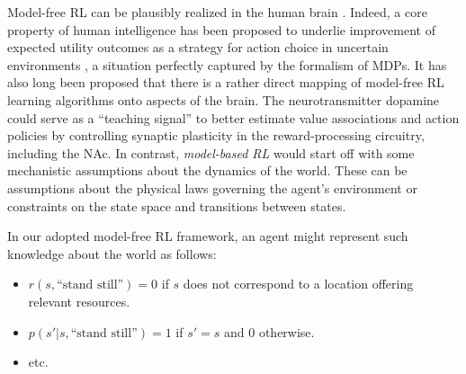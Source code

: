 \documentclass[10pt,letterpaper]{article}
\begin{document}
Model-free RL can be plausibly realized in the human brain \citep{doherty2015structure}. Indeed,
a core property of human intelligence has been proposed to underlie improvement
of expected utility outcomes as a strategy for action choice in uncertain
environments \citep{gershman2015computational}, a situation perfectly captured by the formalism of MDPs.
It has also long been proposed \citep{dayan2008decision} that there
is a rather direct mapping of model-free RL learning algorithms
onto aspects of the brain.
The neurotransmitter dopamine could serve
as a ``teaching signal'' to better estimate value associations
and action policies by controlling
synaptic plasticity in the reward-processing circuitry, including the NAc.
In contrast, \textit{model-based RL} would start off with some mechanistic assumptions about the dynamics of the world.
These can be assumptions about the physical laws governing the agent's environment or constraints on the state space and transitions between states.
%

In our adopted model-free RL framework,
an agent might represent such knowledge about the world as follows:
\begin{itemize}
\item $r(s, \text{``stand still''}) = 0$ if $s$ does not correspond to a location
offering relevant resources.
\item $p(s'|s,\text{``stand still''}) = 1$ if $s'=s$ and $0$ otherwise.
\item etc.
\end{itemize}
\end{document}
